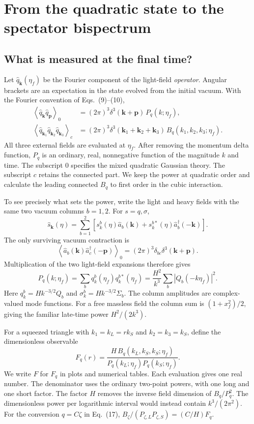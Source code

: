 \documentclass[11pt,a4paper]{article}
\newcommand{\avg}[1]{\left\langle #1\right\rangle}
\begin{document}
\section{From the quadratic state to the spectator bispectrum}
\subsection{What is measured at the final time?}
Let $\hat q_{\mathbf k}(\eta_f)$ be the Fourier component of the light-field \emph{operator}. Angular brackets are an expectation in the state evolved from the initial vacuum. With the Fourier convention of Eqs.~(9)--(10),
\begin{align}
\avg{\hat q_{\mathbf k}\hat q_{\mathbf p}}_0
  &=(2\pi)^3\delta^3(\mathbf k+\mathbf p)\,P_q(k;\eta_f),\\
\avg{\hat q_{\mathbf k_1}\hat q_{\mathbf k_2}\hat q_{\mathbf k_3}}_c
  &=(2\pi)^3\delta^3(\mathbf k_1+\mathbf k_2+\mathbf k_3)\,B_q(k_1,k_2,k_3;\eta_f).
\end{align}
All three external fields are evaluated at $\eta_f$. After removing the momentum delta function, $P_q$ is an ordinary, real, nonnegative function of the magnitude $k$ and time. The subscript $0$ specifies the mixed quadratic Gaussian theory. The subscript $c$ retains the connected part. We keep the power at quadratic order and calculate the leading connected $B_q$ to first order in the cubic interaction.

To see precisely what sets the power, write the light and heavy fields with the same two vacuum columns $b=1,2$. For $s=q,\sigma$,
\begin{equation}
\hat s_{\mathbf k}(\eta)=\sum_{b=1}^2
 [s_k^b(\eta)\hat a_b(\mathbf k)+s_k^{b*}(\eta)\hat a_b^\dagger(-\mathbf k)] .
\end{equation}
The only surviving vacuum contraction is
\[\avg{\hat a_b(\mathbf k)\hat a_c^\dagger(-\mathbf p)}_0=(2\pi)^3\delta_{bc}\delta^3(\mathbf k+\mathbf p).\]
Multiplication of the two light-field expansions therefore gives
\begin{equation}
 P_q(k;\eta_f)=\sum_b q_k^b(\eta_f)q_k^{b*}(\eta_f)
 =\frac{H^2}{k^3}\sum_b|Q_b(-k\eta_f)|^2 .
\end{equation}
Here $q_k^b=H k^{-3/2}Q_b$ and $\sigma_k^b=H k^{-3/2}\Sigma_b$. The column amplitudes are complex-valued mode functions. For a free massless field the column sum is $(1+x_f^2)/2$, giving the familiar late-time power $H^2/(2k^3)$.

For a squeezed triangle with $k_1=k_L=r k_S$ and $k_2=k_3=k_S$, define the dimensionless observable
\begin{equation}\boxed{\displaystyle F_q(r)=\frac{H\,B_q(k_L,k_S,k_S;\eta_f)}
 {P_q(k_L;\eta_f)P_q(k_S;\eta_f)}.}\label{eq:shape}\end{equation}
We write $F$ for $F_q$ in plots and numerical tables. Each evaluation gives one real number. The denominator uses the ordinary two-point powers, with one long and one short factor. The factor $H$ removes the inverse field dimension of $B_q/P_q^2$. The dimensionless power per logarithmic interval would instead contain $k^3/(2\pi^2)$. For the conversion $q=C\zeta$ in Eq.~(17), $B_\zeta/(P_{\zeta,L}P_{\zeta,S})=(C/H)F_q$.
\end{document}
